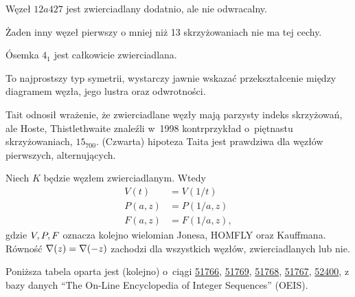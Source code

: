 
\begin{example}
    Węzeł $12a427$ jest zwierciadlany dodatnio, ale nie odwracalny.
\end{example}

Żaden inny węzeł pierwszy o mniej niż 13 skrzyżowaniach nie ma tej cechy.

\begin{example}
    \label{property_of_eight_knot}
    Ósemka $4_1$ jest całkowicie zwierciadlana.
\end{example}

To najprostszy typ symetrii, wystarczy jawnie wskazać przekształcenie między diagramem węzła, jego lustra oraz odwrotności.

Tait odnosił wrażenie, że zwierciadlane węzły mają parzysty indeks skrzyżowań, ale Hoste, Thistlethwaite znaleźli w~1998 kontrprzykład o~piętnastu skrzyżowaniach, $15_{700}$. %
(Czwarta) hipoteza Taita jest prawdziwa dla węzłów pierwszych, alternujących.

\begin{proposition}
    Niech $K$ będzie węzłem zwierciadlanym.
    Wtedy
    \begin{align}
        V(t) & = V(1/t) \\
        P(a, z) & = P(1/a, z) \\
        F(a, z) & = F(1/a, z),
    \end{align}
    gdzie $V, P, F$ oznacza kolejno wielomian Jonesa, HOMFLY oraz Kauffmana.
    Równość $\nabla(z) = \nabla(-z)$ zachodzi dla wszystkich węzłów, zwierciadlanych lub nie.
\end{proposition}

Poniższa tabela oparta jest (kolejno) o~ciągi
\href{https://oeis.org/A051766}{51766},
\href{https://oeis.org/A051769}{51769},
\href{https://oeis.org/A051768}{51768},
\href{https://oeis.org/A051767}{51767},
\href{https://oeis.org/A052400}{52400},
z bazy danych ``The On-Line Encyclopedia of Integer Sequences'' (OEIS).

